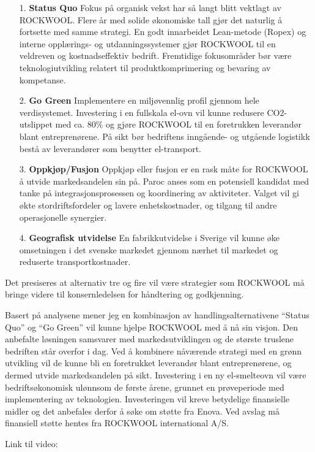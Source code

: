 \begin{itemize}
\item[1.]\textbf{Status Quo}
\indent \newline
Fokus på organisk vekst har så langt blitt vektlagt av ROCKWOOL. Flere år med solide økonomiske tall gjør det naturlig å fortsette med samme strategi. En godt innarbeidet Lean-metode (Ropex) og interne opplærings- og utdanningssystemer gjør ROCKWOOL til en veldreven og kostnadseffektiv bedrift. Fremtidige fokusområder bør være teknologiutvikling relatert til produktkomprimering og bevaring av kompetanse. 

\item[2.]\textbf{Go Green}
\indent \newline
Implementere en miljøvennlig profil gjennom hele verdisystemet. Investering i en fullskala el-ovn vil kunne redusere CO2-utslippet med ca. 80\% og gjøre ROCKWOOL til en foretrukken leverandør blant entreprenørene. På sikt bør bedriftens inngående- og utgående logistikk bestå av leverandører som benytter el-transport.

\item[3.]\textbf{Oppkjøp/Fusjon}
\indent \newline
Oppkjøp eller fusjon er en rask måte for ROCKWOOL å utvide markedsandelen sin på. Paroc anses som en potensiell kandidat med tanke på integrasjonsprosessen og koordinering av aktiviteter. Valget vil gi økte stordriftsfordeler og lavere enhetskostnader, og tilgang til andre operasjonelle synergier.

\item[4.]\textbf{Geografisk utvidelse}
\indent \newline
En fabrikkutvidelse i Sverige vil kunne øke omsetningen i det svenske markedet gjennom nærhet til markedet og reduserte transportkostnader.
\end{itemize}
\indent
Det presiseres at alternativ tre og fire vil være strategier som ROCKWOOL må bringe videre til konsernledelsen for håndtering og godkjenning.

\indent \newline
Basert på analysene mener jeg en kombinasjon av handlingsalternativene “Status Quo” og “Go Green” vil kunne hjelpe ROCKWOOL med å nå sin visjon. Den anbefalte løsningen samsvarer med markedsutviklingen og de største truslene bedriften står overfor i dag. Ved å kombinere nåværende strategi med en grønn utvikling vil de kunne bli en foretrukket leverandør blant entreprenørene, og dermed utvide markedsandelen på sikt. Investering i en ny el-smelteovn vil være bedriftsøkonomisk ulønnsom de første årene, grunnet en prøveperiode med implementering av teknologien. Investeringen vil kreve betydelige finansielle midler og det anbefales derfor å søke om støtte fra Enova. Ved avslag må finansiell støtte hentes fra ROCKWOOL international A/S. 

\indent \newline
Link til video: 
